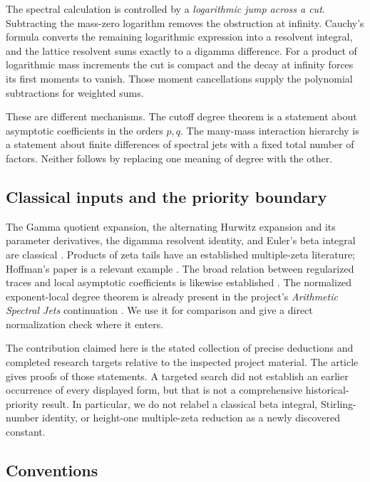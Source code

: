 \documentclass[11pt,letterpaper]{article}
\numberwithin{equation}{section}
\theoremstyle{definition}
\theoremstyle{remark}
\begin{document}
The spectral calculation is controlled by a \emph{logarithmic jump across
a cut}. Subtracting the mass-zero logarithm removes the obstruction at
infinity. Cauchy's formula converts the remaining logarithmic expression
into a resolvent integral, and the lattice resolvent sums exactly to a
digamma difference. For a product of logarithmic mass increments the cut
is compact and the decay at infinity forces its first moments to vanish.
Those moment cancellations supply the polynomial subtractions for weighted
sums.

These are different mechanisms. The cutoff degree theorem is a statement
about asymptotic coefficients in the orders \(p,q\). The many-mass
interaction hierarchy is a statement about finite differences of spectral
jets with a fixed total number of factors. Neither follows by replacing
one meaning of degree with the other.

\subsection{Classical inputs and the priority boundary}

The Gamma quotient expansion, the alternating Hurwitz expansion and its
parameter derivatives, the digamma resolvent identity, and Euler's beta
integral are classical
\cite{DLMF,HuKim,WangHuKim}. Products of zeta tails have an established
multiple-zeta literature; Hoffman's paper is a relevant example
\cite{Hoffman}. The broad relation between regularized traces and local
asymptotic coefficients is likewise established
\cite{PaychaScott}. The normalized exponent-local degree theorem is already
present in the project's \emph{Arithmetic Spectral Jets} continuation
\cite{ProveItArithmeticJets}. We use it for comparison and give a direct
normalization check where it enters.

The contribution claimed here is the stated collection of precise
deductions and completed research targets relative to the inspected
project material. The article gives proofs of those statements. A targeted
search did not establish an earlier occurrence of every displayed form,
but that is not a comprehensive historical-priority result. In particular,
we do not relabel a classical beta integral, Stirling-number identity, or
height-one multiple-zeta reduction as a newly discovered constant.

\subsection{Conventions}
\end{document}
